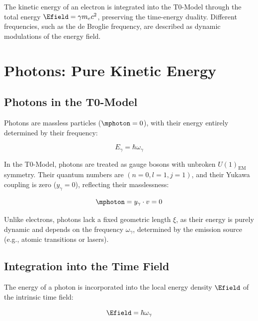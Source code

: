 \begin{important}
	The kinetic energy of an electron is integrated into the T0-Model through the total energy \( \Efield = \gamma m_e c^2 \), preserving the time-energy duality. Different frequencies, such as the de Broglie frequency, are described as dynamic modulations of the energy field.
\end{important}

\section{Photons: Pure Kinetic Energy}
\label{sec:photon_energy}

\subsection{Photons in the T0-Model}
\label{subsec:photon_model}

Photons are massless particles (\( \mphoton = 0 \)), with their energy entirely determined by their frequency:

\begin{equation}
	E_\gamma = \hbar \omega_\gamma
\end{equation}

In the T0-Model, photons are treated as gauge bosons with unbroken \( U(1)_{\text{EM}} \) symmetry. Their quantum numbers are \((n=0, l=1, j=1)\), and their Yukawa coupling is zero (\( y_\gamma = 0 \)), reflecting their masslessness:

\begin{equation}
	\mphoton = y_\gamma \cdot v = 0
\end{equation}

Unlike electrons, photons lack a fixed geometric length \(\xi\), as their energy is purely dynamic and depends on the frequency \(\omega_\gamma\), determined by the emission source (e.g., atomic transitions or lasers).

\subsection{Integration into the Time Field}
\label{subsec:photon_time_field}

The energy of a photon is incorporated into the local energy density \( \Efield \) of the intrinsic time field:

\begin{equation}
	\Efield = \hbar \omega_\gamma
\end{equation}

